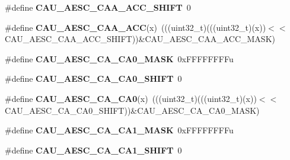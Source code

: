 \begin{DoxyCompactItemize}
\item 
\#define {\bfseries C\+A\+U\+\_\+\+A\+E\+S\+C\+\_\+\+C\+A\+A\+\_\+\+A\+C\+C\+\_\+\+S\+H\+I\+FT}~0\hypertarget{group__CAU__Register__Masks_ga357ec43ab5d98d835aa90df3c8549123}{}\label{group__CAU__Register__Masks_ga357ec43ab5d98d835aa90df3c8549123}

\item 
\#define {\bfseries C\+A\+U\+\_\+\+A\+E\+S\+C\+\_\+\+C\+A\+A\+\_\+\+A\+CC}(x)~(((uint32\+\_\+t)(((uint32\+\_\+t)(x))$<$$<$C\+A\+U\+\_\+\+A\+E\+S\+C\+\_\+\+C\+A\+A\+\_\+\+A\+C\+C\+\_\+\+S\+H\+I\+FT))\&C\+A\+U\+\_\+\+A\+E\+S\+C\+\_\+\+C\+A\+A\+\_\+\+A\+C\+C\+\_\+\+M\+A\+SK)\hypertarget{group__CAU__Register__Masks_ga0a4a08f42b306c2eabc30c85fd071a6d}{}\label{group__CAU__Register__Masks_ga0a4a08f42b306c2eabc30c85fd071a6d}

\item 
\#define {\bfseries C\+A\+U\+\_\+\+A\+E\+S\+C\+\_\+\+C\+A\+\_\+\+C\+A0\+\_\+\+M\+A\+SK}~0x\+F\+F\+F\+F\+F\+F\+F\+Fu\hypertarget{group__CAU__Register__Masks_ga285f901e854cf3e043f122d717e5403d}{}\label{group__CAU__Register__Masks_ga285f901e854cf3e043f122d717e5403d}

\item 
\#define {\bfseries C\+A\+U\+\_\+\+A\+E\+S\+C\+\_\+\+C\+A\+\_\+\+C\+A0\+\_\+\+S\+H\+I\+FT}~0\hypertarget{group__CAU__Register__Masks_gab92e18684282103f4374d6915f54d702}{}\label{group__CAU__Register__Masks_gab92e18684282103f4374d6915f54d702}

\item 
\#define {\bfseries C\+A\+U\+\_\+\+A\+E\+S\+C\+\_\+\+C\+A\+\_\+\+C\+A0}(x)~(((uint32\+\_\+t)(((uint32\+\_\+t)(x))$<$$<$C\+A\+U\+\_\+\+A\+E\+S\+C\+\_\+\+C\+A\+\_\+\+C\+A0\+\_\+\+S\+H\+I\+FT))\&C\+A\+U\+\_\+\+A\+E\+S\+C\+\_\+\+C\+A\+\_\+\+C\+A0\+\_\+\+M\+A\+SK)\hypertarget{group__CAU__Register__Masks_gae8fba02f39d10c4b97783417322f540c}{}\label{group__CAU__Register__Masks_gae8fba02f39d10c4b97783417322f540c}

\item 
\#define {\bfseries C\+A\+U\+\_\+\+A\+E\+S\+C\+\_\+\+C\+A\+\_\+\+C\+A1\+\_\+\+M\+A\+SK}~0x\+F\+F\+F\+F\+F\+F\+F\+Fu\hypertarget{group__CAU__Register__Masks_ga9a7a9ba574f5d6189c7e8f0089f64f8c}{}\label{group__CAU__Register__Masks_ga9a7a9ba574f5d6189c7e8f0089f64f8c}

\item 
\#define {\bfseries C\+A\+U\+\_\+\+A\+E\+S\+C\+\_\+\+C\+A\+\_\+\+C\+A1\+\_\+\+S\+H\+I\+FT}~0\hypertarget{group__CAU__Register__Masks_ga9b82dd689e9be0ca141d7be86cd16c73}{}\label{group__CAU__Register__Masks_ga9b82dd689e9be0ca141d7be86cd16c73}


\end{DoxyCompactItemize}
